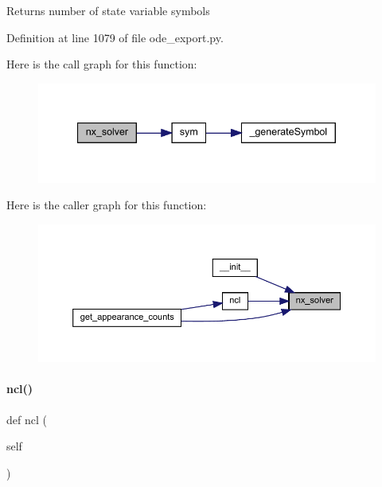 \begin{DoxyReturn}{Returns}
number of state variable symbols 
\end{DoxyReturn}


Definition at line 1079 of file ode\+\_\+export.\+py.

Here is the call graph for this function\+:
\nopagebreak
\begin{figure}[H]
\begin{center}
\leavevmode
\includegraphics[width=340pt]{classamici_1_1ode__export_1_1_o_d_e_model_ae4c34666f3d1d7f0c7a54a0b2322a1f3_cgraph}
\end{center}
\end{figure}
Here is the caller graph for this function\+:
\nopagebreak
\begin{figure}[H]
\begin{center}
\leavevmode
\includegraphics[width=350pt]{classamici_1_1ode__export_1_1_o_d_e_model_ae4c34666f3d1d7f0c7a54a0b2322a1f3_icgraph}
\end{center}
\end{figure}
\mbox{\label{classamici_1_1ode__export_1_1_o_d_e_model_a96964f4a635095d20c61f4976fd3070c}} 
\paragraph{\texorpdfstring{ncl()}{ncl()}}
{\footnotesize\ttfamily def ncl (\begin{DoxyParamCaption}\item[{}]{self }\end{DoxyParamCaption})}

